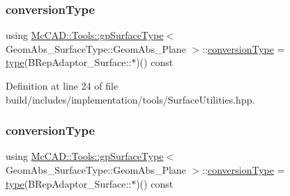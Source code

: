 \subsubsection{\texorpdfstring{conversion\+Type}{conversionType}\hspace{0.1cm}{\footnotesize\ttfamily [1/2]}}
{\footnotesize\ttfamily using \hyperlink{structMcCAD_1_1Tools_1_1gpSurfaceType}{Mc\+C\+A\+D\+::\+Tools\+::gp\+Surface\+Type}$<$ Geom\+Abs\+\_\+\+Surface\+Type\+::\+Geom\+Abs\+\_\+\+Plane $>$\+::\hyperlink{structMcCAD_1_1Tools_1_1gpSurfaceType_3_01GeomAbs__SurfaceType_1_1GeomAbs__Plane_01_4_af051c9209de7043f45d15c7394d66710}{conversion\+Type} =  \hyperlink{structMcCAD_1_1Tools_1_1gpSurfaceType_3_01GeomAbs__SurfaceType_1_1GeomAbs__Plane_01_4_ab24fc89b7c5c8901221bb746493cf7f0}{type}(B\+Rep\+Adaptor\+\_\+\+Surface\+::$\ast$)() const}



Definition at line 24 of file build/includes/implementation/tools/\+Surface\+Utilities.\+hpp.

\mbox{\label{structMcCAD_1_1Tools_1_1gpSurfaceType_3_01GeomAbs__SurfaceType_1_1GeomAbs__Plane_01_4_af051c9209de7043f45d15c7394d66710}} 
\subsubsection{\texorpdfstring{conversion\+Type}{conversionType}\hspace{0.1cm}{\footnotesize\ttfamily [2/2]}}
{\footnotesize\ttfamily using \hyperlink{structMcCAD_1_1Tools_1_1gpSurfaceType}{Mc\+C\+A\+D\+::\+Tools\+::gp\+Surface\+Type}$<$ Geom\+Abs\+\_\+\+Surface\+Type\+::\+Geom\+Abs\+\_\+\+Plane $>$\+::\hyperlink{structMcCAD_1_1Tools_1_1gpSurfaceType_3_01GeomAbs__SurfaceType_1_1GeomAbs__Plane_01_4_af051c9209de7043f45d15c7394d66710}{conversion\+Type} =  \hyperlink{structMcCAD_1_1Tools_1_1gpSurfaceType_3_01GeomAbs__SurfaceType_1_1GeomAbs__Plane_01_4_ab24fc89b7c5c8901221bb746493cf7f0}{type}(B\+Rep\+Adaptor\+\_\+\+Surface\+::$\ast$)() const}




